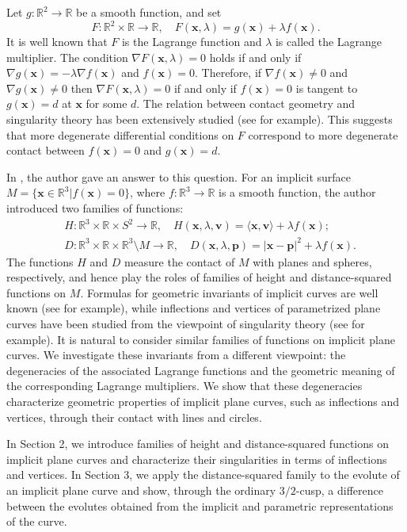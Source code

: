 \documentclass[12pt]{amsart}
\theoremstyle{plain}
\theoremstyle{definition}
\newcommand{\R}{\mathbb{R}}
\renewcommand{\v}{\mathbf{v}}
\newcommand{\x}{\mathbf{x}}
\newcommand{\p}{\mathbf{p}}
\begin{document}
Let $g:\R^2\to\R$ be a smooth function, and set
\begin{equation*}
F:\R^2\times\R\to\R,\quad F(\x,\lambda)=g(\x)+\lambda f(\x).
\end{equation*}
It is well known that $F$ is the Lagrange function and $\lambda$ is
called the Lagrange multiplier. 
The condition $\nabla F(\x,\lambda) = 0$ holds if and only if $\nabla g(\x)=-\lambda\nabla f(\x)$ and $f(\x)=0$. 
Therefore, if $\nabla f(\x)\ne 0$ and $\nabla g(\x) \ne 0$ then $\nabla F(\x,\lambda) = 0$ if and only if $f(\x)=0$ is tangent to $g(\x)=d$ at $\x$ for some $d$. 
The relation between contact geometry and singularity theory has been extensively studied (see \cite{IRRT2015} for example).
This suggests that more degenerate differential conditions on $F$ correspond to more degenerate contact between $f(\x)=0$ and $g(\x)=d$.  

In \cite{Hasegawa2017}, the author gave an answer to this question. 
For an implicit surface $M=\{\x\in\R^3|f(\x)=0\}$, where $f:\R^3\to\R$ is a smooth function, the author introduced two families of functions:
\begin{align*}
& H:\R^3\times\R\times S^2 \to \R,\quad H(\x,\lambda,\v)= \langle \x,\v \rangle+\lambda f(\x);\\
& D:\R^3\times\R\times\R^3\setminus M \to\R,\quad D(\x,\lambda,\p) = |\x-\p|^2+\lambda f(\x). 
\end{align*}
The functions $H$ and $D$ measure the contact of $M$ with planes and spheres, respectively, and hence play the roles of families of height and distance-squared functions on $M$. 
Formulas for geometric invariants of implicit curves are well known (see \cite{Goldman2005} for example), while inflections and vertices of parametrized plane curves have been studied from the viewpoint of singularity theory (see \cite{DT2018,ST2017} for example).
It is natural to consider similar families of functions on implicit plane curves. 
We investigate these invariants from a different viewpoint:
the degeneracies of the associated Lagrange functions and the geometric
meaning of the corresponding Lagrange multipliers. 
We show that these degeneracies characterize geometric properties of implicit plane curves, such as inflections and vertices, through their contact with lines and circles.

In Section 2, we introduce families of height and distance-squared functions on implicit plane curves and characterize their singularities in terms of inflections and vertices. 
In Section 3, we apply the distance-squared family to the evolute of an
implicit plane curve and show, through the ordinary $3/2$-cusp, a
difference between the evolutes obtained from the implicit and
parametric representations of the curve.
\end{document}
